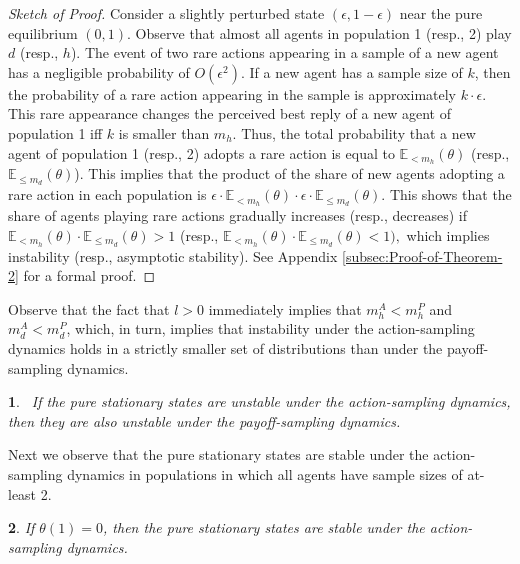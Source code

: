 \documentclass[12pt]{article}
\numberwithin{equation}{section}
\numberwithin{figure}{section}
\theoremstyle{definition}
\theoremstyle{plain}
\theoremstyle{plain}
\theoremstyle{plain}
\theoremstyle{remark}
\theoremstyle{plain}
\theoremstyle{plain}
\newtheorem{cor}{\protect\corollaryname}
\providecommand{\corollaryname}{Corollary}
\def\e{\epsilon}
\begin{document}
\begin{proof}[Sketch of Proof]
Consider a slightly perturbed state $(\epsilon,1-\epsilon)$ near the pure equilibrium $(0,1).$ Observe that almost all agents in population 1 (resp.,  2) play $d$ (resp., $h$). 
The event of two rare actions appearing in a sample of a new agent has a negligible probability of $O(\epsilon^2)$. If a new agent has a sample size of $k$, then the probability of a rare action appearing in the sample is approximately $k \cdot \epsilon.$ This rare appearance changes the perceived best reply of a new agent of population 1 iff $k$ is smaller than $m_{h}$. Thus, the total probability that a new agent of population 1 (resp., 2) adopts a rare action 
is equal to $\mathbb{E}_{<m_{h}}\left(\theta\right)$ (resp., $\mathbb{E}_{\leq m_{d}}\left(\theta\right)$). This implies that the product of the share of new agents adopting a rare action in each population is $\epsilon\cdot\mathbb{E}_{< m_{h}}\left(\theta\right)\cdot\e\cdot\mathbb{E}_{\leq m_{d}}\left(\theta\right)$. This shows that the share of agents playing rare actions gradually increases (resp., decreases) if $\mathbb{E}_{< m_{h}}\left(\theta\right)\cdot\mathbb{E}_{\leq m_{d}}\left(\theta\right)>1$ (resp., $\mathbb{E}_{< m_{h}}\left(\theta\right)\cdot\mathbb{E}_{\leq m_{d}}\left(\theta\right)<1),$ which implies instability (resp., asymptotic stability). See Appendix \ref{subsec:Proof-of-Theorem-2} for a formal proof.
\qedhere

\end{proof}
Observe that the fact that $l>0$ immediately implies that $m_{h}^{A}<m_{h}^{P}$ and $m_{d}^{A}<m_{d}^{P}$,
which, in turn, implies that instability under the action-sampling dynamics holds in a strictly smaller set of distributions than under the payoff-sampling dynamics. 
\begin{cor}
~\label{cor:Instability-A-instability-P}
If the pure stationary states are unstable under the action-sampling dynamics,
then they are also unstable under the payoff-sampling dynamics.

\end{cor}
Next we observe that the pure stationary states are stable under the action-sampling dynamics in populations in which all agents have sample sizes of at-least 2.
\begin{cor}\label{cor:theta-1-action}
If $\theta(1)=0$, then the pure stationary states are stable under the action-sampling dynamics.
\end{cor}
\end{document}
